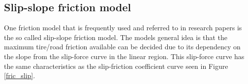 \subsection{Slip-slope friction model}

One friction model that is frequently used and referred to in research papers is the so called slip-slope friction model. The models general idea is that the maximum tire/road friction available can be decided due to its dependency on the slope from the slip-force curve in the linear region. This slip-force curve has the same characteristics as the slip-friction coefficient curve seen in Figure \ref{fric_slip}.

